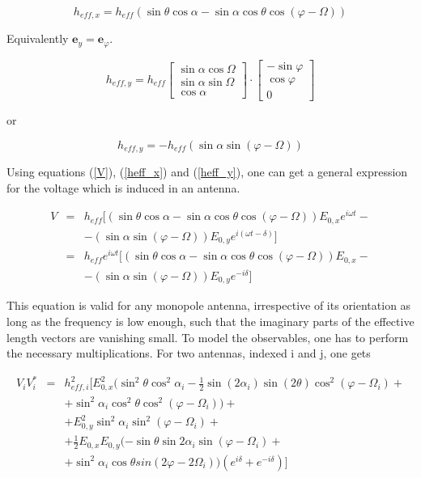\documentclass[a4paper,14pt]{extbook}
\begin{document}
\begin{equation}
{h}_{eff,x} = h_{eff}( \sin \theta \cos \alpha - \sin \alpha \cos\theta\cos (\varphi - \Omega ) )\label{heff_x}
\end{equation}

Equivalently $\textbf{e}_y=\textbf{e}_\varphi$.

\begin{equation}
{h}_{eff,y} = h_{eff} \left[ \begin{array}{c}
\sin \alpha \cos \Omega\\
\sin \alpha \sin \Omega\\
\cos \alpha
\end{array}  \right] \cdot \left[ \begin{array}{c}
-\sin \varphi\\
\cos \varphi\\
0
\end{array}  \right]
\end{equation}

or

\begin{equation}
{h}_{eff,y} = -h_{eff}( \sin \alpha \sin (\varphi - \Omega ) )\label{heff_y}
\end{equation}


Using equations (\ref{V}), (\ref{heff_x}) and (\ref{heff_y}), one can get a general expression for the voltage which is induced in an antenna.

\begin{eqnarray}
V & = & h_{eff} [ (\sin \theta \cos \alpha - \sin \alpha \cos \theta \cos (\varphi - \Omega) )E_{0,x}e^{i \omega t} - \nonumber \\
& & -(\sin \alpha \sin (\varphi - \Omega))E_{0,y}e^{i (\omega t-\delta) } ] \nonumber \\
& = & h_{eff} e^{i \omega t} [ (\sin \theta \cos \alpha - \sin \alpha \cos \theta \cos (\varphi - \Omega) )E_{0,x} - \\
& & -(\sin \alpha \sin (\varphi - \Omega))E_{0,y}e^{-i \delta } ] \nonumber
\end{eqnarray}


This equation is valid for any monopole antenna, irrespective of its orientation as long as the frequency is low enough, such that the imaginary parts of the effective length vectors are vanishing small. To model the observables, one has to perform the necessary multiplications. For two antennas, indexed i and j, one gets

\begin{eqnarray}
V_i V_i^{*} &=& h_{eff,i}^2[E_{0,x}^2 (\sin^2 \theta \cos^2 \alpha_i -\frac{1}{2} \sin (2\alpha_i) \sin(2\theta) \cos^2(\varphi - \Omega_i) + \nonumber \\
& & + \sin^2\alpha_i \cos^2\theta \cos^2(\varphi - \Omega_i))+ \\
& & + E_{0,y}^2 \sin^2\alpha_i \sin^2 (\varphi - \Omega_i) +\nonumber \\
& & +  \frac{1}{2} E_{0,x} E_{0,y} (-\sin \theta \sin 2\alpha_i \sin(\varphi - \Omega_i) + \nonumber \\
&&+\sin^2\alpha_i \cos \theta sin(2\varphi - 2\Omega_i)) (e^{i \delta} + e^{-i \delta } )]\nonumber
\end{eqnarray}
\end{document}
